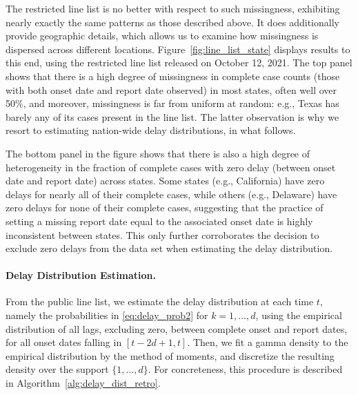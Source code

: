 \documentclass[sts]{imsart}
\theoremstyle{plain}
\theoremstyle{definition}
\theoremstyle{remark}
\begin{document}
The restricted line list is no better with respect to such missingness, 
exhibiting nearly exactly the same patterns as those described above. It
does additionally provide geographic details, which allows us to examine how  
missingness is dispersed across different
locations. Figure~\ref{fig:line_list_state} displays results to this end, using 
the restricted line list released on October 12, 2021. The top panel shows that
there is a high degree of missingness in complete case counts (those with
both onset date and report date observed) in most states, often well over 50\%,
and moreover, missingness is far from uniform at random: e.g., Texas has barely
any of its cases present in the line list. The latter observation is why we
resort to estimating nation-wide delay distributions, in what follows. 

The bottom panel in the figure shows that there is also a high degree of
heterogeneity in the fraction of complete cases with zero delay (between onset
date and report date) across states. Some states (e.g., California) have zero
delays for nearly all of their complete cases, while others (e.g., Delaware)
have zero delays for none of their complete cases, suggesting that the practice
of setting a missing report date equal to the associated onset date is highly
inconsistent between states. This only further corroborates the decision to
exclude zero delays from the data set when estimating the delay distribution. 

\smallskip
\paragraph*{Delay Distribution Estimation.}

From the public line list, we estimate the delay distribution at each time $t$, 
namely the probabilities in \eqref{eq:delay_prob2} for $k=1,\ldots,d$, using the  
empirical distribution of all lags, excluding zero, between complete onset and
report dates, for all onset dates falling in $[t-2d+1, t]$. Then, we fit a gamma
density to the empirical distribution by the method of moments, and discretize
the resulting density over the support $\{1,\ldots,d\}$. For concreteness,
this procedure is described in Algorithm~\ref{alg:delay_dist_retro}.   
\end{document}
